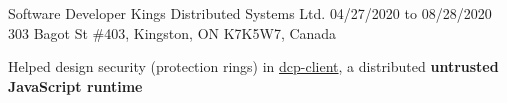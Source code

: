 \begin{cventries}

  \cventry
    {Software Developer} %
    {Kings Distributed Systems Ltd.} %
    {04/27/2020 to 08/28/2020} %
    {303 Bagot St \#403, Kingston, ON K7K5W7, Canada} %
    {
      \begin{cvitems} %
        \item{Helped design security (protection rings) in \href{https://www.npmjs.com/package/dcp-client}{dcp-client}, a distributed \textbf{untrusted JavaScript runtime}}

\end{cvitems}}
\end{cventries}
